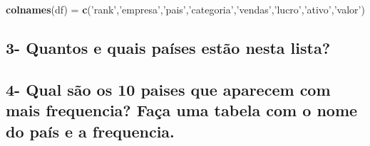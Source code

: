 \documentclass[
]{article}
\newenvironment{Shaded}{\begin{snugshade}}{\end{snugshade}}
\newcommand{\DataTypeTok}[1]{\textcolor[rgb]{0.13,0.29,0.53}{#1}}
\newcommand{\DecValTok}[1]{\textcolor[rgb]{0.00,0.00,0.81}{#1}}
\newcommand{\KeywordTok}[1]{\textcolor[rgb]{0.13,0.29,0.53}{\textbf{#1}}}
\newcommand{\NormalTok}[1]{#1}
\newcommand{\OperatorTok}[1]{\textcolor[rgb]{0.81,0.36,0.00}{\textbf{#1}}}
\newcommand{\OtherTok}[1]{\textcolor[rgb]{0.56,0.35,0.01}{#1}}
\newcommand{\StringTok}[1]{\textcolor[rgb]{0.31,0.60,0.02}{#1}}
\begin{document}
\begin{Shaded}
\begin{Highlighting}[]
\KeywordTok{colnames}\NormalTok{(df) =}\StringTok{ }\KeywordTok{c}\NormalTok{(}\StringTok{'rank'}\NormalTok{,}\StringTok{'empresa'}\NormalTok{,}\StringTok{'pais'}\NormalTok{,}\StringTok{'categoria'}\NormalTok{,}\StringTok{'vendas'}\NormalTok{,}\StringTok{'lucro'}\NormalTok{,}\StringTok{'ativo'}\NormalTok{,}\StringTok{'valor'}\NormalTok{)}
\end{Highlighting}
\end{Shaded}

\hypertarget{quantos-e-quais-pauxedses-estuxe3o-nesta-lista}{%
\subsection{3- Quantos e quais países estão nesta
lista?}\label{quantos-e-quais-pauxedses-estuxe3o-nesta-lista}}

\begin{Shaded}
\end{Shaded}

\hypertarget{qual-suxe3o-os-10-paises-que-aparecem-com-mais-frequencia-fauxe7a-uma-tabela-com-o-nome-do-pauxeds-e-a-frequencia.}{%
\subsection{4- Qual são os 10 paises que aparecem com mais frequencia?
Faça uma tabela com o nome do país e a
frequencia.}\label{qual-suxe3o-os-10-paises-que-aparecem-com-mais-frequencia-fauxe7a-uma-tabela-com-o-nome-do-pauxeds-e-a-frequencia.}}

\begin{Shaded}
\end{Shaded}
\end{document}
